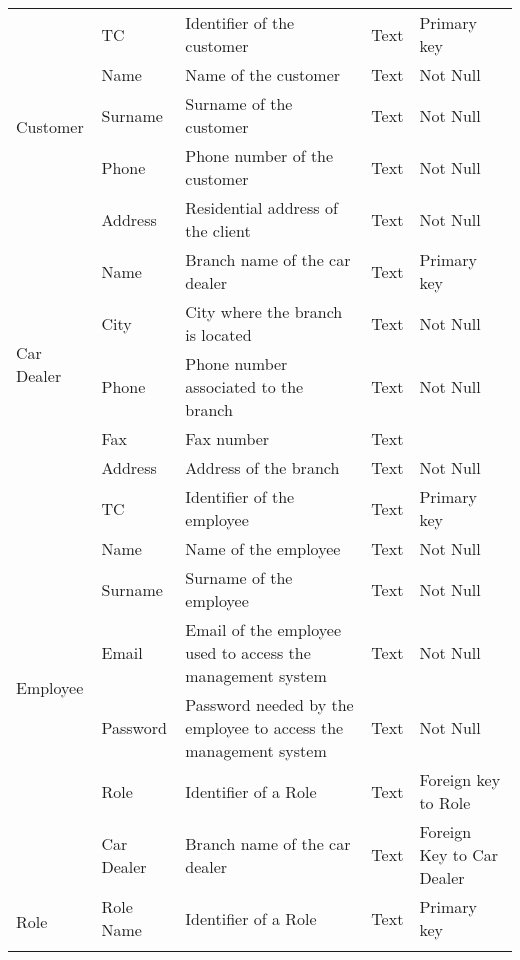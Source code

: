 \begin{longtable}{|p{}|p{} |p{}|p{}|p{} |}
\multirow{5}{*}{Customer}
    & TC & Identifier of the customer & Text & Primary key \\\cline{2-5}
    & Name & Name of the customer & Text & Not Null \\\cline{2-5}
    & Surname & Surname of the customer & Text & Not Null \\\cline{2-5}
    & Phone & Phone number of the customer & Text & Not Null \\\cline{2-5}
    & Address &  Residential address of the client & Text & Not Null \\\hline

\multirow{5}{*}{Car Dealer} 
    & Name & Branch name of the car dealer & Text & Primary key \\\cline{2-5}
    & City & City where the branch is located & Text & Not Null \\\cline{2-5}  
    & Phone & Phone number associated to the branch & Text & Not Null \\\cline{2-5}  
    & Fax & Fax number & Text & \\\cline{2-5}
    & Address & Address of the branch & Text & Not Null \\\hline

\multirow{7}{*}{Employee} 
    & TC & Identifier of the employee & Text & Primary key \\\cline{2-5} 
    & Name & Name of the employee & Text & Not Null \\\cline{2-5}
    & Surname & Surname of the employee & Text & Not Null \\\cline{2-5}
    & Email & Email of the employee used to access the management system & Text & Not Null \\\cline{2-5}
    & Password & Password needed by the employee to access the management system & Text & Not Null \\\cline{2-5}
    & Role & Identifier of a Role & Text & Foreign key to Role\\\cline{2-5}
    & Car Dealer & Branch name of the car dealer & Text & Foreign Key to Car Dealer \\\hline

\multirow{2}{*}{Role} 
    & Role Name & Identifier of a Role & Text & Primary key \\\cline{2-5}
    \\\hline


\end{longtable}
